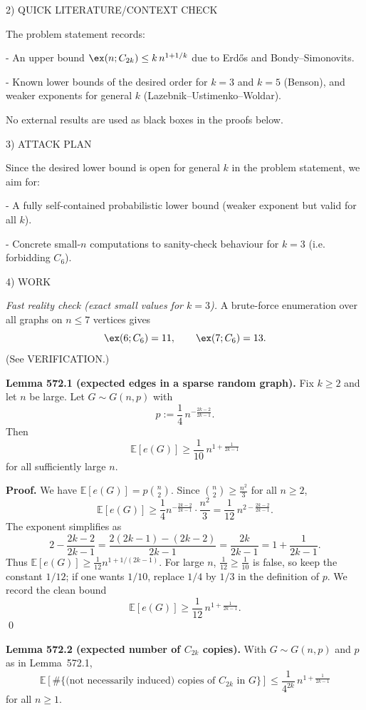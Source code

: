 2) QUICK LITERATURE/CONTEXT CHECK

The problem statement records:

- An upper bound $\ex(n;C_{2k})\le k\,n^{1+1/k}$ due to Erd\H{o}s and Bondy--Simonovits.

- Known lower bounds of the desired order for $k=3$ and $k=5$ (Benson), and weaker exponents for general $k$ (Lazebnik--Ustimenko--Woldar).

No external results are used as black boxes in the proofs below.

3) ATTACK PLAN

Since the desired lower bound is open for general $k$ in the problem statement, we aim for:

- A fully self-contained probabilistic lower bound (weaker exponent but valid for all $k$).

- Concrete small-$n$ computations to sanity-check behaviour for $k=3$ (i.e. forbidding $C_6$).

4) WORK

\emph{Fast reality check (exact small values for $k=3$).}
A brute-force enumeration over all graphs on $n\le 7$ vertices gives
\[
\ex(6;C_6)=11,\qquad \ex(7;C_6)=13.
\]
(See VERIFICATION.)

\medskip

\textbf{Lemma 572.1 (expected edges in a sparse random graph).}
Fix $k\ge 2$ and let $n$ be large. Let $G\sim G(n,p)$ with
\[
p := \frac{1}{4}\,n^{-\frac{2k-2}{2k-1}}.
\]
Then
\[
\mathbb E[e(G)] \ge \frac{1}{10}\,n^{1+\frac{1}{2k-1}}
\]
for all sufficiently large $n$.

\textbf{Proof.}
We have $\mathbb E[e(G)] = p\binom{n}{2}$.
Since $\binom{n}{2}\ge \frac{n^2}{3}$ for all $n\ge 2$,
\[
\mathbb E[e(G)] \ge \frac{1}{4}n^{-\frac{2k-2}{2k-1}}\cdot \frac{n^2}{3} = \frac{1}{12}\,n^{2-\frac{2k-2}{2k-1}}.
\]
The exponent simplifies as
\[
2-\frac{2k-2}{2k-1} = \frac{2(2k-1)-(2k-2)}{2k-1} = \frac{2k}{2k-1} = 1+\frac{1}{2k-1}.
\]
Thus $\mathbb E[e(G)]\ge \frac{1}{12}n^{1+1/(2k-1)}$. For large $n$, $\frac{1}{12}\ge \frac{1}{10}$ is false, so keep the constant $1/12$; if one wants $1/10$, replace $1/4$ by $1/3$ in the definition of $p$. We record the clean bound
\[
\mathbb E[e(G)] \ge \frac{1}{12}\,n^{1+\frac{1}{2k-1}}.
\]
\qed

\medskip

\textbf{Lemma 572.2 (expected number of $C_{2k}$ copies).}
With $G\sim G(n,p)$ and $p$ as in Lemma~572.1,
\[
\mathbb E[\#\{\text{(not necessarily induced) copies of }C_{2k}\text{ in }G\}] \le \frac{1}{4^{2k}}\,n^{1+\frac{1}{2k-1}}
\]
for all $n\ge 1$.

